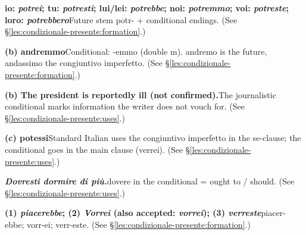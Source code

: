 \documentclass[11pt,a4paper,twoside,openright]{book}
\newcommand{\answerheading}[1]{\par\medskip\noindent{\sffamily\bfseries\small #1}\par\nopagebreak}
\begin{document}
\answerheading{\S\ref{les:condizionale-presente} Condizionale presente}\label{ans:condizionale-presente}
\begin{answers}
\item\relax \textbf{io: \textit{potrei}; tu: \textit{potresti}; lui/lei: \textit{potrebbe}; noi: \textit{potremmo}; voi: \textit{potreste}; loro: \textit{potrebbero}}\newline Future stem potr- + conditional endings. {\color{muted}(See \S\ref{les:condizionale-presente:formation}.)}
\item\relax \textbf{(b) andremmo}\newline Conditional: -emmo (double m). andremo is the future, andassimo the congiuntivo imperfetto. {\color{muted}(See \S\ref{les:condizionale-presente:formation}.)}
\item\relax \textbf{(b) The president is reportedly ill (not confirmed).}\newline The journalistic conditional marks information the writer does not vouch for. {\color{muted}(See \S\ref{les:condizionale-presente:uses}.)}
\item\relax \textbf{(c) potessi}\newline Standard Italian uses the congiuntivo imperfetto in the se-clause; the conditional goes in the main clause (verrei). {\color{muted}(See \S\ref{les:condizionale-presente:uses}.)}
\item\relax \textbf{\textit{Dovresti dormire di più.}}\newline dovere in the conditional = ought to / should. {\color{muted}(See \S\ref{les:condizionale-presente:uses}.)}
\item\relax \textbf{(1) \textit{piacerebbe}; (2) \textit{Vorrei} {\color{muted}(also accepted: \textit{vorrei})}; (3) \textit{verreste}}\newline piacer-ebbe; vorr-ei; verr-este. {\color{muted}(See \S\ref{les:condizionale-presente:formation}.)}
\end{answers}
\end{document}
